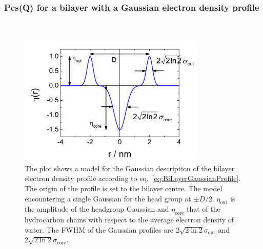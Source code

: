 \clearpage

\subsubsection{Pcs(Q) for a bilayer with a Gaussian electron density profile \cite{Pabst2000,Pabst2003}} ~\\
\label{plugin:Pcs:GaussianProfile}

\begin{figure}[htb]
\begin{center}
\includegraphics[width=0.8\textwidth,height=0.55\textwidth]{../images/form_factor/anisotropic/BiLayerGauss_Profile.png}
\end{center}
\caption{
The plot shows a model for the Gaussian description of the bilayer electron density profile according to
eq.\ \ref{eq:BiLayerGaussianProfile}.
The origin of the profile is set to the bilayer centre. The model encountering a single Gaussian for the head
group at $\pm D/2$. $\eta_\textrm{out}$ is the amplitude of the headgroup Gaussian and $\eta_\textrm{core}$ that of
the hydrocarbon chains with respect to the average electron density of water. The FWHM of the Gaussian profiles are
$2\sqrt{2\ln 2}\sigma_\textrm{out}$ and $2\sqrt{2\ln 2}\sigma_\textrm{core}$.}
\label{fig:bilayerprofile}
\end{figure}

